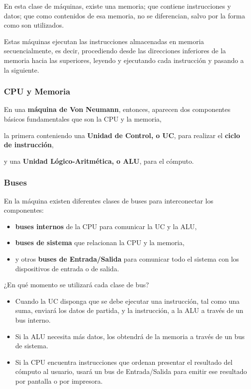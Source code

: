 \documentclass[spanish,A4,]{article}
\begin{document}
En esta clase de máquinas, existe una memoria; que contiene
instrucciones y datos; que como contenidos de esa memoria, no se
diferencian, salvo por la forma como son utilizados.

Estas máquinas ejecutan las instrucciones almacenadas en memoria
secuencialmente, es decir, procediendo desde las direcciones inferiores
de la memoria hacia las superiores, leyendo y ejecutando cada
instrucción y pasando a la siguiente.

\subsubsection{CPU y Memoria}\label{cpu-y-memoria}

En una \textbf{máquina de Von Neumann}, entonces, aparecen dos
componentes básicos fundamentales que son la CPU y la memoria,

la primera conteniendo una \textbf{Unidad de Control, o UC}, para
realizar el \textbf{ciclo de instrucción},

y una \textbf{Unidad Lógico-Aritmética, o ALU}, para el cómputo.

\subsubsection{Buses}\label{buses}

En la máquina existen diferentes clases de buses para interconectar los
componentes:

\begin{itemize}
\item
  \textbf{buses internos} de la CPU para comunicar la UC y la ALU,
\item
  \textbf{buses de sistema} que relacionan la CPU y la memoria,
\item
  y otros \textbf{buses de Entrada/Salida} para comunicar todo el
  sistema con los dispositivos de entrada o de salida.
\end{itemize}

¿En qué momento se utilizará cada clase de bus?

\begin{itemize}
\itemsep1pt\parskip0pt
\item
  Cuando la UC disponga que se debe ejecutar una instrucción, tal como
  una suma, enviará los datos de partida, y la instrucción, a la ALU a
  través de un bus interno.
\item
  Si la ALU necesita más datos, los obtendrá de la memoria a través de
  un bus de sistema.
\item
  Si la CPU encuentra instrucciones que ordenan presentar el resultado
  del cómputo al usuario, usará un bus de Entrada/Salida para emitir ese
  resultado por pantalla o por impresora.
\end{itemize}
\end{document}
